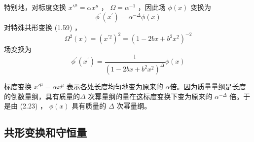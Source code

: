 特别地，对标度变换 $x'^\mu=\alpha x^\mu$ ， $\Omega=\alpha^{-1}$ ，因此场 $\phi(x)$ 变换为
\begin{equation}
\phi^{\prime}\left(x^{\prime}\right)=\alpha^{-\Delta} \phi(x)
\end{equation}
对特殊共形变换 (1.59) ，
\begin{equation}
	\Omega^{2}(x)=\left(x^{\prime 2}\right)^{2}=\left(1-2 b x+b^{2} x^{2}\right)^{-2}
\end{equation}
场变换为
\begin{equation}
		\phi^{\prime}\left(x^{\prime}\right)=\frac{1}{\left(1-2 b x+b^{2} x^{2}\right)^{\Delta}} \phi(x)
\end{equation}

标度变换 $x'^\mu=\alpha x^\mu$ 表示各处长度均匀地变为原来的 $\alpha $倍。因为质量量纲是长度的倒数量纲，具有质量的$ \Delta$ 次幂量纲的量在这标度变换下变为原来的 $\alpha^{-\Delta}$ 倍。于是由 (2.23) ， $\phi(x)$ 具有质量的 $\Delta$ 次幂量纲。

\subsection{共形变换和守恒量}

